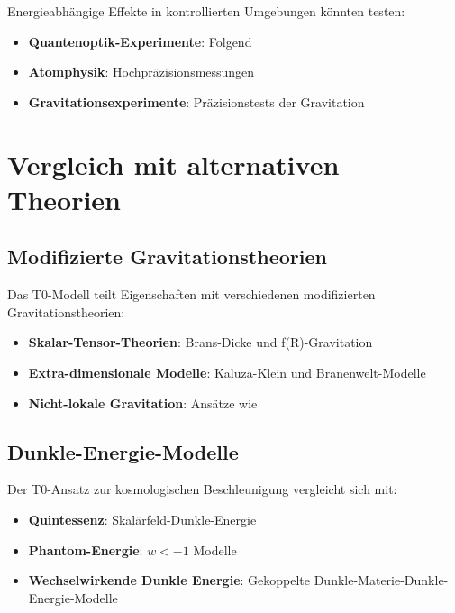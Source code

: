 \documentclass[12pt,a4paper]{article}
\begin{document}
	Energieabhängige Effekte in kontrollierten Umgebungen könnten testen:
	\begin{itemize}
		\item \textbf{Quantenoptik-Experimente}: Folgend \citep{scully1997,knight1998}
		\item \textbf{Atomphysik}: Hochpräzisionsmessungen \citep{demtroder2008}
		\item \textbf{Gravitationsexperimente}: Präzisionstests der Gravitation \citep{will2014,adelberger2003}
	\end{itemize}
	
	\section{Vergleich mit alternativen Theorien}
	\label{sec:alternative_theories}
	
	\subsection{Modifizierte Gravitationstheorien}
	\label{subsec:modified_gravity}
	
	Das T0-Modell teilt Eigenschaften mit verschiedenen modifizierten Gravitationstheorien:
	
	\begin{itemize}
		\item \textbf{Skalar-Tensor-Theorien}: Brans-Dicke \citep{brans1961} und f(R)-Gravitation \citep{sotiriou2010}
		\item \textbf{Extra-dimensionale Modelle}: Kaluza-Klein \citep{kaluza1921,klein1926} und Branenwelt-Modelle \citep{randall1999}
		\item \textbf{Nicht-lokale Gravitation}: Ansätze wie \citep{woodard2007,koivisto2008}
	\end{itemize}
	
	\subsection{Dunkle-Energie-Modelle}
	\label{subsec:dark_energy_models}
	
	Der T0-Ansatz zur kosmologischen Beschleunigung vergleicht sich mit:
	\begin{itemize}
		\item \textbf{Quintessenz}: Skalärfeld-Dunkle-Energie \citep{caldwell1998,steinhardt1999}
		\item \textbf{Phantom-Energie}: $w < -1$ Modelle \citep{caldwell2003}
		\item \textbf{Wechselwirkende Dunkle Energie}: Gekoppelte Dunkle-Materie-Dunkle-Energie-Modelle \citep{amendola2000}
	\end{itemize}
	
\end{document}
